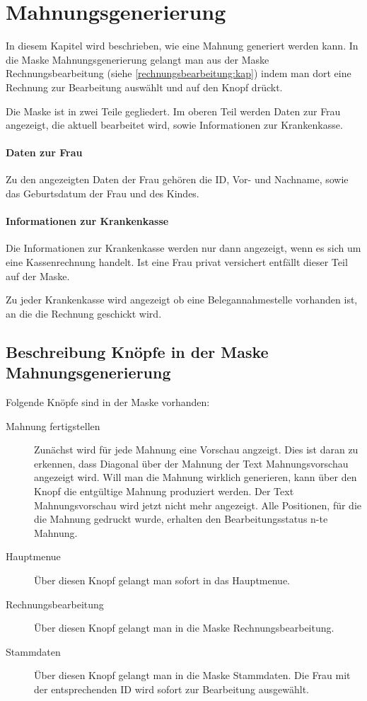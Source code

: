 \section{Mahnungsgenerierung}\label{mahnungsgenerierung:kap}

In diesem Kapitel wird beschrieben, wie eine Mahnung generiert werden 
kann. In die Maske Mahnungsgenerierung gelangt man aus der Maske 
Rechnungsbearbeitung (siehe \vref{rechnungsbearbeitung:kap}) indem man dort
eine Rechnung zur Bearbeitung auswählt und auf den Knopf 
 drückt.

Die Maske ist in zwei Teile gegliedert. Im oberen Teil werden Daten zur Frau
angezeigt, die aktuell bearbeitet wird, sowie Informationen zur Krankenkasse.

\paragraph{Daten zur Frau}
Zu den angezeigten Daten der Frau gehören 
die ID, Vor- und Nachname, sowie das Geburtsdatum der Frau und
des Kindes. 


\paragraph{Informationen zur Krankenkasse}
Die Informationen zur Krankenkasse werden nur dann angezeigt, wenn es
sich um eine Kassenrechnung handelt. Ist eine Frau privat versichert 
entfällt dieser Teil auf der Maske.

Zu jeder Krankenkasse wird angezeigt ob eine Belegannahmestelle vorhanden ist,
an die die Rechnung geschickt wird.


\subsection{Beschreibung Knöpfe in der Maske Mahnungsgenerierung}
Folgende Knöpfe sind in der Maske vorhanden:

\begin{description}
\item[Mahnung fertigstellen]

Zunächst wird für jede Mahnung eine Vorschau angzeigt. Dies
ist daran zu erkennen, dass Diagonal über der Mahnung der Text
Mahnungsvorschau angezeigt wird. Will man die Mahnung wirklich generieren,
kann über den Knopf  die
entgültige Mahnung produziert werden. 
Der Text Mahnungsvorschau wird jetzt nicht mehr angezeigt. 
Alle Positionen, für die die
Mahnung gedruckt wurde, erhalten den Bearbeitungsstatus n-te Mahnung.

\item[Hauptmenue]
Über diesen Knopf gelangt man sofort in das \tinyHeb\/ Hauptmenue.

\item[Rechnungsbearbeitung]
Über diesen Knopf gelangt man in die Maske Rechnungsbearbeitung.

\item[Stammdaten]
Über diesen Knopf gelangt man in die Maske Stammdaten. Die Frau mit der
entsprechenden ID wird sofort zur Bearbeitung ausgewählt.
\end{description}
